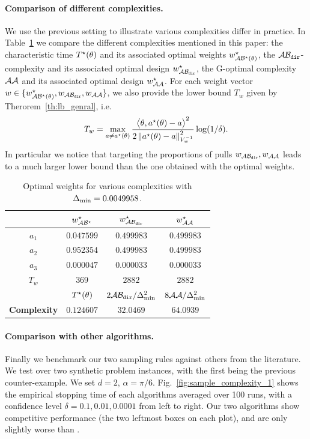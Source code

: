 \paragraph{Comparison of different complexities.}
We use the previous setting to illustrate various complexities differ in practice. In Table~\ref{table:optimal_weights} we compare the different complexities mentioned in this paper: the characteristic time $T^{\star}(\theta)$ and its associated optimal weights $w^\star_{\mathcal{A}\mathcal{B}^\star(\theta)}$, the $\mathcal{A}\mathcal{B}_{\texttt{dir}}$-complexity and its associated optimal design $w^\star_{\mathcal{A}\mathcal{B}_{\texttt{dir}}}$, the G-optimal complexity $\mathcal{A}\mathcal{A}$ and its associated optimal design $w^\star_{\mathcal{A}\mathcal{A}}$. For each weight vector $w \in\{w^\star_{\mathcal{A}\mathcal{B}^\star(\theta)},w_{\mathcal{A}\mathcal{B}_{\texttt{dir}}}, w_{\mathcal{A}\mathcal{A}}\}$,
 we also provide the lower bound $T_w$ given by Therorem~\ref{th:lb_genral}, i.e.
 \[
 T_w = \max_{a\neq a^\star(\theta)} \frac{\big\langle \theta, a^\star(\theta)-a\big\rangle^2}{2\left\lVert a^\star(\theta)-a\right\rVert_{V_w^{-1}}^2} \log(1/\delta).
\]
In particular we notice that targeting the proportions of pulls $w_{\mathcal{A}\mathcal{B}_{\texttt{dir}}}, w_{\mathcal{A}\mathcal{A}}$ leads to a much larger lower bound than the one obtained with the optimal weights.
\begin{table}[t!]
\centering
\begin{tabular}{|c|c|c|c|}
 \hline
   & $w^\star_{\mathcal{A}\mathcal{B}^\star}$ & $w^\star_{\mathcal{A}\mathcal{B}_{\texttt{dir}}}$  & $w^\star_{\mathcal{A}\mathcal{A}}$   \\
 \hline
 \textbf{$a_1$} & $0.047599$ & $0.499983$ & $0.499983$ \\
 \hline
 \textbf{$a_2$} & $0.952354$ & $0.499983$ & $0.499983$ \\
 \hline
 \textbf{$a_3$} & $0.000047$ & $0.000033$ & $0.000033$ \\
 \hline
 \textbf{$T_w$} & $369$ & $2882$ & $2882$ \\
 \hline
   & $T^{\star}(\theta)$ & $2\mathcal{A}\mathcal{B}_{\texttt{dir}}/\Delta_\text{min}^2$ & $8\mathcal{A}\mathcal{A}/\Delta_\text{min}^2$\\
 \hline
  \textbf{Complexity} & $0.124607$ & $32.0469$ & $64.0939$ \\
 \hline
\end{tabular}
\caption{Optimal weights for various complexities with $\Delta_\text{min}= 0.0049958$.}
\label{table:optimal_weights}
\end{table}

\paragraph{Comparison with other algorithms.}
Finally we benchmark our two sampling rules against others from the literature. %
We test over two synthetic problem instances, with the first being the previous counter-example. We set $d=2$, $\alpha=\pi/6$. Fig.~\ref{fig:sample_complexity_1} shows the empirical stopping time of each algorithms averaged over 100 runs, with a confidence level $\delta=0.1, 0.01, 0.0001$ from left to right. Our two algorithms show competitive performance (the two leftmost boxes on each plot), and are only slightly worse than \LGapE.

